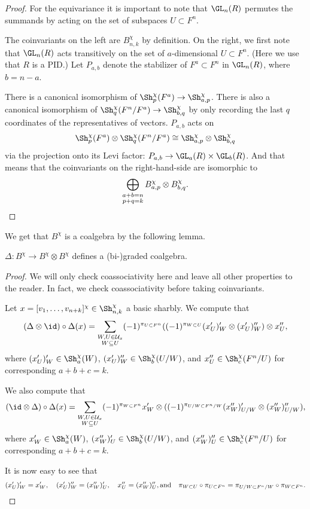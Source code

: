 \begin{proof}
For the equivariance it is important to note that $\GL_n(R)$ permutes the summands by acting on the set of subspaces $U\subset F^n$. 

The coinvariants on the left are $B^\chi_{n,k}$ by definition. On the right, we first note that $\GL_n(R)$ acts transitively on the set of $a$-dimensional $U\subset F^n$. (Here we use that $R$ is a PID.) Let $P_{a,b}$ denote the stabilizer of $F^a \subset F^n$ in $\GL_n(R)$, where $b=n-a$.

There is a canonical isomorphism of $\Sh^\chi_p(F^a) \to \Sh^\chi_{a,p}$. There is also a canonical isomorphism of $\Sh^\chi_q(F^n/F^a) \to \Sh^\chi_{b,q}$ by only recording the last $q$ coordinates of the representatives of vectors. $P_{a,b}$ acts on 
\[\Sh^\chi_{p}(F^a) \otimes \Sh^\chi_{q}(F^n/F^a) \cong \Sh^\chi_{a,p} \otimes \Sh^\chi_{b,q}\]
 via the projection onto its Levi factor: $P_{a,b} \to \GL_a(R) \times \GL_b(R)$. And that means that the coinvariants on the right-hand-side are isomorphic to
\[\bigoplus_{\substack{a+b=n\\p+q=k}} B^\chi_{a,p} \otimes B^\chi_{b,q}.\qedhere\]
\end{proof}

We get that $B^\chi$ is a coalgebra by the following lemma.

\begin{lemma}
$\Delta\colon B^\chi \to B^\chi \otimes B^\chi$ defines a (bi-)graded coalgebra.
\end{lemma}

\begin{proof}
We will only check coassociativity here and leave all other properties to the reader. In fact, we check coassociativity before taking coinvariants.

Let $x = [v_1, \dots, v_{n+k}]^\chi\in \Sh^\chi_{n,k}$ a basic sharbly. We compute that
\[ (\Delta \otimes \id) \circ \Delta (x) = \sum_{\substack{W,U \in \mathcal U_x\\W \subseteq U}}
(-1)^{\pi_{U \subset F^n}}
 ((-1)^{\pi_{W\subset U}} (x'_{U})'_W \otimes (x'_{U})''_W ) \otimes x''_{U},\]
where $(x'_{U})'_W \in \Sh^\chi_a(W)$, $(x'_{U})''_W \in  \Sh^\chi_ b(U/W)$, and $x''_{U} \in \Sh^\chi_c(F^n/U)$ for corresponding $a+b+c=k$.

We also compute that
\[ (\id \otimes \Delta) \circ \Delta (x) = \sum_{\substack{W,U \in \mathcal U_x\\W \subseteq U}}
(-1)^{\pi_{W\subset F^n}}
 x'_{W} \otimes ((-1)^{\pi_{U/W \subset F^n/W}} (x''_{W})'_{U/W}  \otimes (x''_{W})''_{U/W}),\]
where $x'_W \in \Sh^\chi_a(W)$, $(x''_{W})'_{U}  \in \Sh^\chi_ b(U/W)$, and $(x''_{W})''_{U} \in \Sh^\chi_c(F^n/U)$ for corresponding $a+b+c=k$.

It is now easy to see that
\[ (x'_{U})'_W = x'_W , \quad (x'_{U})''_W = (x''_{W})'_{U}, \quad x''_{U} = (x''_{W})''_{U},\text{and} \quad \pi_{W\subset U} \circ \pi_{U \subset F^n}= \pi_{U/W \subset F^n/W}\circ \pi_{W\subset F^n} .\qedhere\]
\end{proof}

